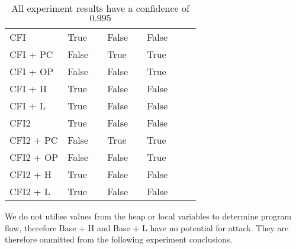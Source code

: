 \begin{table}[H]
\begin{tabular}{l|l|l|l|l|l|l|l}
    CFI       & True &\relax[0.990, 1] & False & \relax[0, 0.01] & False & \relax[0,0.01]   & ~ \\
    CFI + PC  & False & \relax[0.723, 0.733] & True & \relax[0.227, 0.237] & True & \relax[0.031, 0.041]  & ~ \\
    CFI + OP  & False & \relax[0.990, 1] & False & \relax[0, 0.01] & True & \relax[0,0.01]    & ~ \\
    CFI + H   & True &\relax[0.990, 1] & False & \relax[0, 0.01] & False & \relax[0, 0.01]   & ~ \\
    CFI + L   & True & \relax[0.990, 1] & False & \relax[0, 0.01] & False & \relax[0, 0.01]    & ~ \\
    CFI2       & True &\relax[0.990, 1] & False & \relax[0, 0.01] & False & \relax[0, 0.01]  & ~ \\
    CFI2 + PC  & False & \relax[0.782, 0.792] & True & \relax[0.183, 0.193] & True & \relax[0.021, 0.031]  & ~ \\
    CFI2 + OP  & False & \relax[0.990, 1] & False & \relax[0, 0.01] & True & \relax[0, 0.01]     & ~ \\
    CFI2 + H   & True &\relax[0.990, 1] & False & \relax[0, 0.01] & False & \relax[0, 0.01]   & ~ \\
    CFI2 + L   & True & \relax[0.990, 1] & False & \relax[0, 0.01] & False & \relax[0, 0.01]   & ~ \\
    \end{tabular}
    \caption{All experiment results have a confidence of $0.995$}
\end{table}

\noindent We do not utilise values from the heap or local variables to determine program flow, therefore Base + H and Base + L have no potential for attack. They are therefore ommitted from the following experiment conclusions.